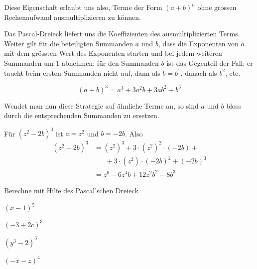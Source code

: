 \documentclass[%
11pt,%
twoside,%
titlepage,%
german,%
]{scrartcl}
\begin{document}
Diese Eigenschaft erlaubt uns also, Terme der Form $(a+b)^n$ ohne grossen Rechenaufwand ausmultiplizieren zu k\"onnen.
\begin{bem}
Das Pascal-Dreieck liefert uns die Koeffizienten des ausmultiplizierten Terms. Weiter gilt f\"ur die beteiligten Summanden $a$ und $b$, dass die Exponenten von $a$ mit dem gr\"ossten Wert des Exponenten starten und bei jedem weiteren Summanden um $1$ abnehmen; f\"ur den Summanden $b$ ist das Gegenteil der Fall: er taucht beim ersten Summanden nicht auf, dann als $b=b^1$, danach als $b^2$, etc.
\end{bem}
\begin{bsp}
$$(a+b)^3=a^3+3a^2b+3ab^2+b^3$$
\end{bsp}
Wendet man nun diese Strategie auf \"ahnliche Terme an, so sind $a$ und $b$ bloss durch die entsprechenden Summanden zu ersetzen.
\begin{bsp}
F\"ur $(z^2-2b)^3$ ist $a=z^2$ und $b=-2b$. Also
\begin{align*}
(z^2-2b)^3&=(z^2)^3+3\cdot(z^2)^2\cdot(-2b)+\\
&\phantom{=\;}+3\cdot(z^2)\cdot(-2b)^2+(-2b)^3\\
&=z^6-6z^4b+12z^2b^2-8b^3
\end{align*}
\end{bsp}

\begin{ueb}
Berechne mit Hilfe des Pascal'schen Dreieck

\begin{minipage}{0.23\textwidth}
\begin{enumeratea}
\item $(x-1)^5$
\item $(-3+2c)^3$
\end{enumeratea}
\end{minipage}
\begin{minipage}{0.23\textwidth}
\begin{enumeratea}
\addtocounter{enumi}{2}
\item $(y^3-2)^3$
\item $(-x-z)^4$
\end{enumeratea}
\end{minipage}
\end{ueb}

\clearpage



\end{document}
